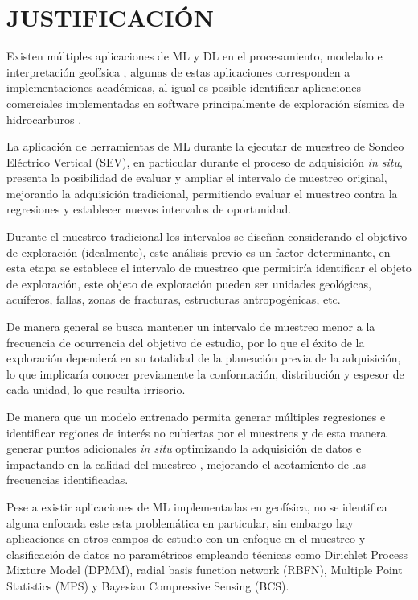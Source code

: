 \chapter{JUSTIFICACIÓN}
Existen múltiples aplicaciones de ML y DL en el procesamiento, modelado e interpretación geofísica \citep{li2024, liu2020,el2001,wrona2018}, algunas de estas aplicaciones corresponden a implementaciones académicas, al igual es posible identificar aplicaciones comerciales implementadas en software principalmente de exploración sísmica de hidrocarburos \citep{diaferia2024high, panebianco2024automated}.



La aplicación de herramientas de ML durante la ejecutar de muestreo de Sondeo Eléctrico Vertical (SEV), en particular durante el proceso de adquisición \textit{in situ}, presenta la posibilidad de evaluar y ampliar el intervalo de muestreo original, mejorando la adquisición tradicional, permitiendo evaluar el muestreo contra la regresiones y establecer nuevos intervalos de oportunidad.

Durante el muestreo tradicional los intervalos se diseñan considerando el objetivo de exploración (idealmente), este análisis previo es un factor determinante, en esta etapa se establece el intervalo de muestreo que permitiría identificar el objeto de exploración, este objeto de exploración pueden ser unidades geológicas, acuíferos, fallas, zonas de fracturas, estructuras antropogénicas, etc.

De manera general se busca mantener un intervalo de muestreo menor a la frecuencia de ocurrencia del objetivo de estudio, por lo que el éxito de la exploración dependerá en su totalidad de la planeación previa de la adquisición, lo que implicaría conocer previamente la conformación, distribución y espesor de cada unidad, lo que resulta irrisorio.

De manera que un modelo entrenado permita generar múltiples regresiones e identificar regiones de interés no cubiertas por el muestreos y de esta manera generar puntos adicionales \textit{in situ} optimizando la adquisición de datos e impactando en la calidad del muestreo , mejorando el acotamiento de las frecuencias identificadas.

Pese a existir aplicaciones de ML implementadas en geofísica, no se identifica alguna enfocada este esta problemática en particular, sin embargo hay aplicaciones en otros campos de estudio con un enfoque en el muestreo y clasificación de datos no paramétricos \citep{entezami2022non, bkassiny2013multidimensional, shi2021non} empleando técnicas como Dirichlet Process Mixture Model (DPMM), radial basis function network (RBFN),  Multiple Point Statistics (MPS) y Bayesian Compressive Sensing (BCS).

